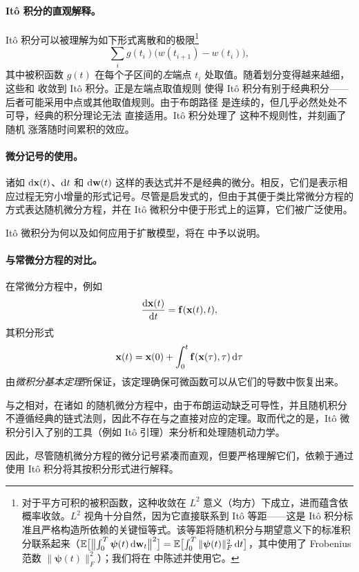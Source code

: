 \paragraph{Itô 积分的直观解释。}
Itô 积分可以被理解为如下形式离散和的极限\footnote{对于平方可积的被积函数，这种收敛在 $L^2$ 意义（均方）下成立，进而蕴含依概率收敛。$L^2$ 视角十分自然，因为它直接联系到 Itô 等距——这是 Itô 积分标准且严格构造所依赖的关键恒等式。该等距将随机积分与期望意义下的标准积分联系起来（$\mathbb{E}\bigl[\bigl\|\int_0^T \bm{\psi}(t)\,\mathrm{d}{\mathbf{w}}_t \bigr\|^2\bigr] = \mathbb{E}\bigl[\int_0^T \|\bm{\psi}(t)\|_F^2\,\mathrm{d}t\bigr]$，其中使用了 Frobenius 范数
$\|\bm{\psi}(t)\|_F^2$）；我们将在  中陈述并使用它。}
\[
\sum_i g(t_i)\bigl(w(t_{i+1})-w(t_i)\bigr),
\]
其中被积函数 $g(t)$ 在每个子区间的\emph{左}端点
$t_i$ 处取值。随着划分变得越来越细，这些和
收敛到 Itô 积分。正是左端点取值规则
使得 Itô 积分有别于经典积分——后者可能采用中点或其他取值规则。由于布朗路径
是连续的，但几乎必然处处不可导，经典的积分理论无法
直接适用。Itô 积分处理了
这种不规则性，并刻画了随机
涨落随时间累积的效应。

\paragraph{微分记号的使用。}
诸如 $ \mathop{}\!\mathrm{d} {\mathbf{x}}(t) $、$ \mathop{}\!\mathrm{d} t $ 和 $ \mathop{}\!\mathrm{d} {\mathbf{w}}(t) $ 这样的表达式并不是经典的微分。相反，它们是表示相应过程无穷小增量的形式记号。尽管是启发式的，但由于其便于类比常微分方程的方式表达随机微分方程，并在 Itô 微积分中便于形式上的运算，它们被广泛使用。

Itô 微积分为何以及如何应用于扩散模型，将在  中予以说明。


\paragraph{与常微分方程的对比。}
在常微分方程中，例如
\[
\frac{\mathop{}\!\mathrm{d} {\mathbf{x}}(t)}{\mathop{}\!\mathrm{d} t} = {\mathbf{f}}({\mathbf{x}}(t), t),
\]
其积分形式
\[
{\mathbf{x}}(t) = {\mathbf{x}}(0) + \int_0^t {\mathbf{f}}({\mathbf{x}}(\tau), \tau) \mathop{}\!\mathrm{d} \tau
\]
由\emph{微积分基本定理}所保证，该定理确保可微函数可以从它们的导数中恢复出来。

与之相对，在诸如  的随机微分方程中，由于布朗运动缺乏可导性，并且随机积分不遵循经典的链式法则，因此不存在与之直接对应的定理。取而代之的是，Itô 微积分引入了别的工具（例如 Itô 引理）来分析和处理随机动力学。

因此，尽管随机微分方程的微分记号紧凑而直观，但要严格理解它们，依赖于通过使用 Itô 积分将其按积分形式进行解释。



